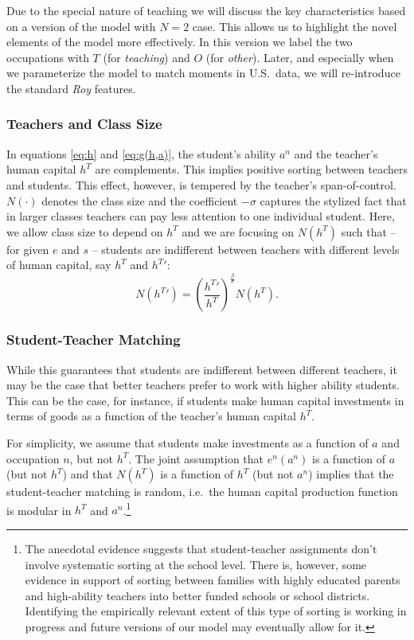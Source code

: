 \documentclass[onehalfspacing,11pt]{article}
\begin{document}
Due to the special nature of teaching we will discuss the key characteristics based on a version of the model with $N=2$ case. This allows us to highlight the novel elements of the model more effectively. In this version we label the two occupations with $T$ (for {\it teaching}) and $O$ (for {\it other}). Later, and especially when we parameterize the model to match moments in U.S.~data, we will re-introduce the standard {\it Roy} features.


\subsubsection{Teachers and Class Size}
In equations \eqref{eq:h} and \eqref{eq:g(h,a)}, the student's ability $a^n$ and the teacher's human capital $h^T$ are complements. This implies positive sorting between teachers and students. This effect, however, is tempered by the teacher's span-of-control. $N(\cdot)$ denotes the class size and the coefficient $-\sigma$ captures the stylized fact that in larger classes teachers can pay less attention to one individual student. Here, we allow class size to depend on $h^T$ and we are focusing on $N(h^T)$ such that -- for given $e$ and $s$ -- students are indifferent between teachers with different levels of human capital, say $h^T$ and ${h^T}'$:
 \begin{equation}
\label{ }
N({h^T}') = \left(\frac{{h^T}'}{{h^T}}\right)^{\frac{\beta}{\sigma}} N({h^T}).
\end{equation}
\subsubsection{Student-Teacher Matching}
While this guarantees that students are indifferent between different teachers, it may be the case that better teachers prefer to work with higher ability students. This can be the case, for instance, if students make human capital investments in terms of goods as a function of the teacher's human capital $h^T$. 

For simplicity, we assume that students make investments as a function of $a$ and occupation $n$, but not $h^T$. The joint assumption that $e^n(a^n)$ is a function of $a$ (but not $h^T$) and that $N(h^T)$ is a function of $h^T$ (but not $a^n$) implies that the student-teacher matching is random, i.e.~the human capital production function is modular in $h^T$ and $a^n$.\footnote{The anecdotal evidence suggests that student-teacher assignments don't involve systematic sorting at the school level. There is, however, some evidence in support of sorting between families with highly educated parents and high-ability teachers into better funded schools or school districts. Identifying the empirically relevant extent of this type of sorting is working in progress and future versions of our model may eventually allow for it.}
\end{document}
